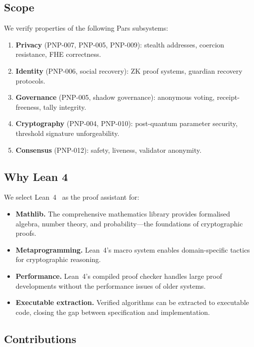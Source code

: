 \documentclass[11pt,a4paper]{article}
\begin{document}
\subsection{Scope}

We verify properties of the following Pars subsystems:

\begin{enumerate}
    \item \textbf{Privacy} (PNP-007, PNP-005, PNP-009): stealth
    addresses, coercion resistance, FHE correctness.
    \item \textbf{Identity} (PNP-006, social recovery): ZK proof
    systems, guardian recovery protocols.
    \item \textbf{Governance} (PNP-005, shadow governance): anonymous
    voting, receipt-freeness, tally integrity.
    \item \textbf{Cryptography} (PNP-004, PNP-010): post-quantum
    parameter security, threshold signature unforgeability.
    \item \textbf{Consensus} (PNP-012): safety, liveness, validator
    anonymity.
\end{enumerate}

\subsection{Why Lean 4}

We select Lean~4~\cite{moura2021lean4} as the proof assistant for:

\begin{itemize}
    \item \textbf{Mathlib.}  The comprehensive mathematics library
    provides formalised algebra, number theory, and probability---the
    foundations of cryptographic proofs.
    \item \textbf{Metaprogramming.}  Lean~4's macro system enables
    domain-specific tactics for cryptographic reasoning.
    \item \textbf{Performance.}  Lean~4's compiled proof checker handles
    large proof developments without the performance issues of older
    systems.
    \item \textbf{Executable extraction.}  Verified algorithms can be
    extracted to executable code, closing the gap between specification
    and implementation.
\end{itemize}

\subsection{Contributions}
\end{document}
